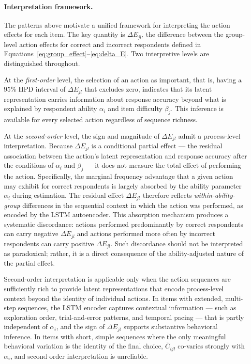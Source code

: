 \paragraph*{Interpretation framework.}
The patterns above motivate a unified framework for interpreting the action effects for each item. The key quantity is $\Delta E_{jl}$, the difference between the group-level action effects for correct and incorrect respondents defined in Equations~\eqref{eq:group_effect}--\eqref{eq:delta_E}. Two interpretive levels are distinguished throughout.

At the \emph{first-order} level, the selection of an action as important, that is, having a 95\% HPD interval of $\Delta E_{jl}$ that excludes zero, indicates that its latent representation carries information about response accuracy beyond what is explained by respondent ability $\alpha_i$ and item difficulty $\beta_j$. This inference is available for every selected action regardless of sequence richness.

At the \emph{second-order} level, the sign and magnitude of $\Delta E_{jl}$ admit a process-level interpretation. Because $\Delta E_{jl}$ is a conditional partial effect --- the residual association between the action's latent representation and response accuracy after the conditions of $\alpha_i$ and $\beta_j$ --- it does not measure the total effect of performing the action. Specifically, the marginal frequency advantage that a given action may exhibit for correct respondents is largely absorbed by the ability parameter $\alpha_i$ during estimation. The residual effect $\Delta E_{jl}$ therefore reflects \emph{within-ability-group} differences in the sequential context in which the action was performed, as encoded by the LSTM autoencoder. This absorption mechanism produces a systematic discordance: actions performed predominantly by correct respondents can carry negative $\Delta E_{jl}$ and actions performed more often by incorrect respondents can carry positive $\Delta E_{jl}$. Such discordance should not be interpreted as paradoxical; rather, it is a direct consequence of the ability-adjusted nature of the partial effect.

Second-order interpretation is applicable only when the action sequences are sufficiently rich to provide latent representations that encode process-level context beyond the identity of individual actions. In items with extended, multi-step sequences, the LSTM encoder captures contextual information --- such as exploration order, trial-and-error patterns, and temporal pacing --- that is partly independent of $\alpha_i$, and the sign of $\Delta E_{jl}$ supports substantive behavioral inference. In items with short, simple sequences where the only meaningful behavioral variation is the identity of the final choice, $\bar{C}_{ijl}$ co-varies strongly with $\alpha_i$, and second-order interpretation is unreliable.


